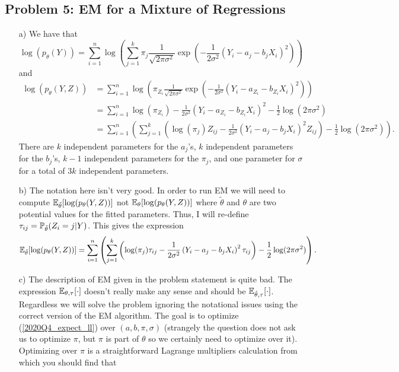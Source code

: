 \subsection*{Problem 5: EM for a Mixture of Regressions}

\begin{enumerate}
\item[a)] 
We have that 
\[
\log(p_{\theta}(Y)) = \sum_{i=1}^n \log\left(\sum_{j=1}^k \pi_j \frac{1}{\sqrt{2\pi\sigma^2}} \exp\left(-\frac{1}{2\sigma^2} \left(Y_i - a_j - b_jX_i\right)^2 \right) \right)
\]
and 
\begin{align*}
\log(p_{\theta}(Y,Z)) & = \sum_{i=1}^n \log\left( \pi_{Z_i} \frac{1}{\sqrt{2\pi\sigma^2}} \exp\left(-\frac{1}{2\sigma^2} \left(Y_i - a_{Z_i} - b_{Z_i}X_i\right)^2 \right) \right)\\
& = \sum_{i=1}^n \log(\pi_{Z_i}) - \frac{1}{2\sigma^2}  \left(Y_i - a_{Z_i} - b_{Z_i}X_i\right)^2 - \frac{1}{2}\log(2\pi\sigma^2)\\
& = \sum_{i=1}^n \left( \sum_{j=1}^k \left( \log(\pi_{j}) Z_{ij} - \frac{1}{2\sigma^2}  \left(Y_i - a_{j} - b_{j}X_i\right)^2 Z_{ij} \right)- \frac{1}{2}\log(2\pi\sigma^2) \right).
\end{align*}
There are $k$ independent parameters for the $a_j$'s, $k$ independent parameters for the $b_j$'s, $k-1$ independent parameters for the $\pi_j$, and one parameter for $\sigma$ for a total of $3k$ independent parameters.
\item[b)]
The notation here isn't very good. In order to run EM we will need to compute $\mathbb{E}_{\tilde{\theta}}[\log(p_{\theta}(Y,Z))]$ not $\mathbb{E}_{\theta}[\log(p_{\theta}(Y,Z))]$ where $\tilde{\theta}$ and $\theta$ are two potential values for the fitted parameters. Thus, I will re-define $\tau_{ij} = \mathbb{P}_{\tilde{\theta}}(Z_i = j|Y)$. This gives the expression
\begin{equation}\label{2020Q4_expect_ll}
\mathbb{E}_{\tilde{\theta}}[\log(p_{\theta}(Y,Z))] = \sum_{i=1}^n \left( \sum_{j=1}^k \left( \log(\pi_{j})\tau_{ij} - \frac{1}{2\sigma^2}  \left(Y_i - a_{j} - b_{j}X_i\right)^2 \tau_{ij}  \right) - \frac{1}{2}\log(2\pi\sigma^2) \right).
\end{equation}
\item[c)]
The description of EM given in the problem statement is quite bad. The expression $\mathbb{E}_{\theta,\tau}[\cdot]$ doesn't really make any sense and should be $\mathbb{E}_{\hat{\theta},\tau}[\cdot]$. Regardless we will solve the problem ignoring the notational issues using the correct version of the EM algorithm. The goal is to optimize (\ref{2020Q4_expect_ll}) over $(a,b,\pi,\sigma)$ (strangely the question does not ask us to optimize $\pi$, but $\pi$ is part of $\theta$ so we certainly need to optimize over it). Optimizing over $\pi$ is a straightforward Lagrange multipliers calculation from which you should find that 

\end{enumerate}
